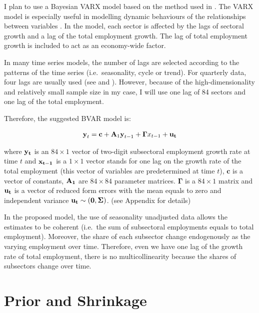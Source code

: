 \documentclass{monashthesis}
\begin{document}
I plan to use a Bayesian VARX model based on the method used in \textcite{anderson2020}. The VARX model is especially useful in modelling dynamic behaviours of the relationships between variables \autocite{warsono2019}. In the model, each sector is affected by the lags of sectoral growth and a lag of the total employment growth. The lag of total employment growth is included to act as an economy-wide factor.

In many time series models, the number of lags are selected according to the patterns of the time series (i.e.~seasonality, cycle or trend). For quarterly data, four lags are usually used (see \textcite{anderson2020} and \textcite{stock2001}). However, because of the high-dimensionality and relatively small sample size in my case, I will use one lag of 84 sectors and one lag of the total employment.

Therefore, the suggested BVAR model is:

\[
\begin{aligned}
\textbf{y}_t=\textbf{c}+\textbf{A}_1 \textbf{y}_{t-1}+\boldsymbol{\Gamma}{x}_{t-1}+\bf{u}_t
\end{aligned}
\]

where \(\bf{y}_t\) is an \(84\times1\) vector of two-digit subsectoral employment growth rate at time \(t\) and \(\bf{x}_{t-1}\) is a \(1\times1\) vector stands for one lag on the growth rate of the total employment (this vector of variables are predetermined at time \(t\)), \(\textbf{c}\) is a vector of constants, \(\bf{A}_{1}\) are \(84\times84\) parameter matrices. \(\boldsymbol{\Gamma}\) is a \(84\times1\) matrix and \(\bf{u}_t\) is a vector of reduced form errors with the mean equals to zero and independent variance \(\bf{u}_t \sim (0,\boldsymbol{\Sigma})\). (see Appendix for details)

In the proposed model, the use of seasonality unadjusted data allows the estimates to be coherent (i.e.~the sum of subsectoral employments equals to total employment). Moreover, the share of each subsector change endogenously as the varying employment over time. Therefore, even we have one lag of the growth rate of total employment, there is no multicollinearity because the shares of subsectors change over time.

\hypertarget{prior-and-shrinkage}{%
\section{Prior and Shrinkage}\label{prior-and-shrinkage}}
\end{document}
